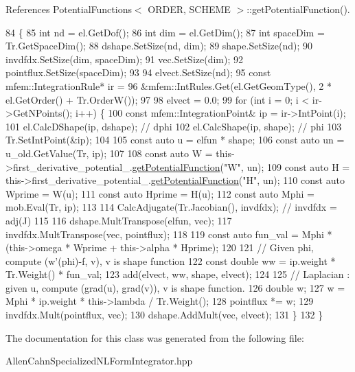 References Potential\+Functions$<$ O\+R\+D\+E\+R, S\+C\+H\+E\+M\+E $>$\+::get\+Potential\+Function().


\begin{DoxyCode}
84                         \{
85   \textcolor{keywordtype}{int} nd = el.GetDof();
86   \textcolor{keywordtype}{int} dim = el.GetDim();
87   \textcolor{keywordtype}{int} spaceDim = Tr.GetSpaceDim();
88   dshape.SetSize(nd, dim);
89   shape.SetSize(nd);
90   invdfdx.SetSize(dim, spaceDim);
91   vec.SetSize(dim);
92   pointflux.SetSize(spaceDim);
93 
94   elvect.SetSize(nd);
95   \textcolor{keyword}{const} mfem::IntegrationRule* ir =
96       &mfem::IntRules.Get(el.GetGeomType(), 2 * el.GetOrder() + Tr.OrderW());
97 
98   elvect = 0.0;
99   \textcolor{keywordflow}{for} (\textcolor{keywordtype}{int} i = 0; i < ir->GetNPoints(); i++) \{
100     \textcolor{keyword}{const} mfem::IntegrationPoint& ip = ir->IntPoint(i);
101     el.CalcDShape(ip, dshape);  \textcolor{comment}{// dphi}
102     el.CalcShape(ip, shape);    \textcolor{comment}{// phi}
103     Tr.SetIntPoint(&ip);
104 
105     \textcolor{keyword}{const} \textcolor{keyword}{auto} u = elfun * shape;
106     \textcolor{keyword}{const} \textcolor{keyword}{auto} un = u\_old.GetValue(Tr, ip);
107 
108     \textcolor{keyword}{const} \textcolor{keyword}{auto} W = this->first\_derivative\_potential\_.\hyperlink{classPotentialFunctions_a63a86cbadc57d531e0c0fa987ac9fea6}{getPotentialFunction}(\textcolor{stringliteral}{"W"}, un);
109     \textcolor{keyword}{const} \textcolor{keyword}{auto} H = this->first\_derivative\_potential\_.\hyperlink{classPotentialFunctions_a63a86cbadc57d531e0c0fa987ac9fea6}{getPotentialFunction}(\textcolor{stringliteral}{"H"}, un);
110     \textcolor{keyword}{const} \textcolor{keyword}{auto} Wprime = W(u);
111     \textcolor{keyword}{const} \textcolor{keyword}{auto} Hprime = H(u);
112     \textcolor{keyword}{const} \textcolor{keyword}{auto} Mphi = mob.Eval(Tr, ip);
113 
114     CalcAdjugate(Tr.Jacobian(), invdfdx);  \textcolor{comment}{// invdfdx = adj(J)}
115 
116     dshape.MultTranspose(elfun, vec);
117     invdfdx.MultTranspose(vec, pointflux);
118 
119     \textcolor{keyword}{const} \textcolor{keyword}{auto} fun\_val = Mphi * (this->omega * Wprime + this->alpha * Hprime);
120 
121     \textcolor{comment}{// Given phi, compute (w'(phi)-f, v), v is shape function}
122     \textcolor{keyword}{const} \textcolor{keywordtype}{double} ww = ip.weight * Tr.Weight() * fun\_val;
123     add(elvect, ww, shape, elvect);
124 
125     \textcolor{comment}{// Laplacian : given u, compute (grad(u), grad(v)), v is shape function.}
126     \textcolor{keywordtype}{double} w;
127     w = Mphi * ip.weight * this->lambda / Tr.Weight();
128     pointflux *= w;
129     invdfdx.Mult(pointflux, vec);
130     dshape.AddMult(vec, elvect);
131   \}
132 \}
\end{DoxyCode}


The documentation for this class was generated from the following file\+:\begin{DoxyCompactItemize}
\item 
Allen\+Cahn\+Specialized\+N\+L\+Form\+Integrator.\+hpp\end{DoxyCompactItemize}
